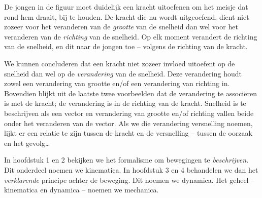 \documentclass{ximera}
\begin{document}
De jongen in de figuur moet duidelijk een kracht uitoefenen om het meisje dat rond hem draait, bij te houden. De kracht die nu wordt uitgeoefend, dient niet zozeer voor het veranderen van de \textit{grootte} van de snelheid dan wel voor het veranderen van de \textit{richting} van de snelheid. Op elk moment verandert de richting van de snelheid, en dit naar de jongen toe -- volgens de richting van de kracht.

We kunnen concluderen dat een kracht niet zozeer invloed uitoefent op de snelheid dan wel op de \textit{verandering} van de snelheid. Deze verandering houdt zowel een verandering van grootte en/of een verandering van richting in. Bovendien blijkt uit de laatste twee voorbeelden dat de verandering te associ\"eren is met de kracht; de verandering is in de richting van de kracht. Snelheid is te beschrijven als een vector en verandering van grootte en/of richting vallen beide onder het veranderen van de vector. Als we die verandering versnelling noemen, lijkt er een relatie te zijn tussen de kracht en de versnelling -- tussen de oorzaak en het gevolg\ldots

In hoofdstuk 1 en 2 bekijken we het formalisme om bewegingen te \textit{beschrijven}. Dit onderdeel noemen we kinematica. In hoofdstuk 3 en 4 behandelen we dan het \textit{verklarende} principe achter de beweging. Dit noemen we dynamica. Het geheel -- kinematica en dynamica -- noemen we mechanica.
\end{document}
